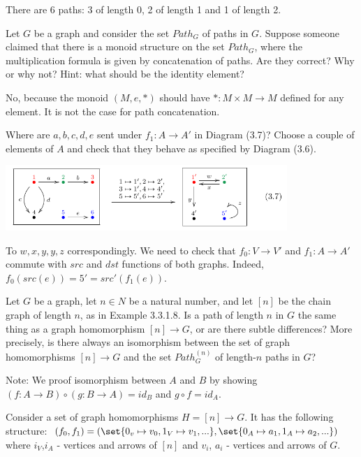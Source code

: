 \documentclass{article}
\begin{document}
\ans

There are 6 paths: 3 of length 0, 2 of length 1 and 1 of length 2.


Let $G$ be a graph and consider the set $Path_G$ of paths in $G$. Suppose
someone claimed that there is a monoid structure on the set $Path_G$, where the
multiplication formula is given by concatenation of paths. Are they correct? Why
or why not? Hint: what should be the identity element?

\ans

No, because the monoid $(M,e,*)$ should have $*:M \times M\to M$ defined for any
element. It is not the case for path concatenation.


\es Where are $a, b, c, d, e$ sent under $f_1 : A \to A'$ in Diagram (3.7)?
\ei Choose a couple of elements of $A$ and check that they behave as specified
    by Diagram (3.6).
\ee

\begin{center}
\includegraphics[width=0.8\textwidth]{img/graph-homomorphism.png}
\end{center}

\ans

\es To $w, x, y, y, z$ correspondingly.
\ei We need to check that $f_0: V \to V'$ and $f_1:A \to A'$ commute with $src$
    and $dst$ functions of both graphs. Indeed, $f_0(src(e)) = 5' =
    src'(f_1(e))$.
\ee


Let $G$ be a graph, let $n \in N$ be a natural number, and let $[n]$ be the
chain graph of length $n$, as in Example 3.3.1.8. Is a path of length $n$ in $G$
the same thing as a graph homomorphism $[n] \to G$, or are there subtle
differences? More precisely, is there always an isomorphism between the set of
graph homomorphisms $[n] \to G$ and the set $Path_G^{(n)}$ of length-$n$ paths
in $G$?

\ans

Note: We proof isomorphism between $A$ and $B$ by showing $(f:A\to B) \circ (g:B
\to A) = id_B$ and $g \circ f = id_A$.

Consider a set of graph homomorphisms $H = [n] \to G$. It has the following structure:
$(f_0, f_1) = (\set{0_v \mapsto v_0, 1_V \mapsto v_1, ...}, \set{0_A \mapsto
a_1, 1_A \mapsto a_2, ...})$ where $i_V$,$i_A$ - vertices and arrows of $[n]$
and $v_i$, $a_i$ - vertices and arrows of $G$.
\end{document}
